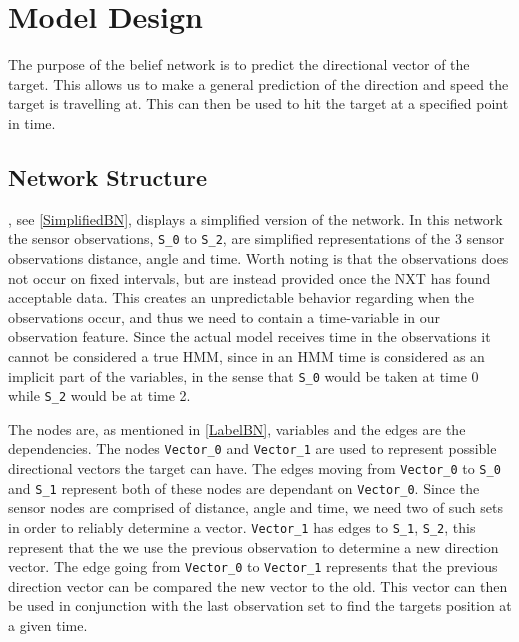 \chapter{Model Design}

The purpose of the belief network is to predict the directional vector of the
target. This allows us to make a general prediction of the direction and speed
the target is travelling at. This can then be used to hit the target at a
specified point in time. 


\section{Network Structure}
, see
\autoref{SimplifiedBN}, displays a simplified version of the network. In this
network the sensor observations, \texttt{S\_0} to \texttt{S\_2}, are simplified
representations of the 3 sensor observations distance, angle and time. Worth
noting is that the observations does not occur on fixed intervals, but are
instead provided once the NXT has found acceptable data. This creates an
unpredictable behavior regarding when the observations occur, and thus we need
to contain a time-variable in our observation feature. Since the actual model
receives time in the observations it cannot be considered a true HMM, since in
an HMM time is considered as an implicit part of the variables, in the sense
that \texttt{S\_0} would be taken at time 0 while \texttt{S\_2} would be at
time 2.


The nodes are, as mentioned in \autoref{LabelBN}, variables and the edges are
the dependencies. The nodes \texttt{Vector\_0} and \texttt{Vector\_1} are used
to represent possible directional vectors the target can have. The edges moving
from \texttt{Vector\_0} to \texttt{S\_0} and \texttt{S\_1} represent both of
these nodes are dependant on \texttt{Vector\_0}. Since the sensor nodes are
comprised of distance, angle and time, we need two of such sets in order to reliably
determine a vector. \texttt{Vector\_1} has edges to \texttt{S\_1},
\texttt{S\_2}, this represent that the we use the previous observation to
determine a new direction vector. The edge going from \texttt{Vector\_0} to
\texttt{Vector\_1} represents that the previous direction vector can be compared
the new vector to the old. This vector can then be used in conjunction with the
last observation set to find the targets position at a given time.

